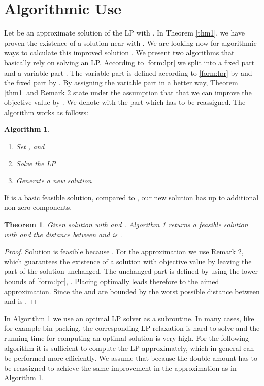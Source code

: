 \documentclass[a4paper,11pt]{article}
\newtheorem{thm}{Theorem}
\newtheorem{algo}{Algorithm}
\begin{document}
\section{Algorithmic Use}
Let  be an approximate solution of the LP with . 
In Theorem \ref{thm1}, we have proven the existence of a solution  near  with 
.
We are looking now for algorithmic ways to calculate this improved solution .
We present two algorithms that basically rely on solving an LP.
According to \ref{form:lpr} 
we split  into a fixed part  and a variable part .
The variable part is defined according to \ref{form:lpr} by  and the fixed part by . By assigning the variable part in a better way, Theorem
\ref{thm1} and Remark 2 state under the assumption that  that 
we can improve the objective value by . 
We denote with  the part which has to be reassigned. The
algorithm works as follows:
\begin{algo} \label{alg1}
\ 
  \begin{enumerate}
\item Set , 
  and 
\item Solve the LP 
\item Generate a new solution 
  \end{enumerate}
\end{algo}
If  is a basic feasible solution, compared to , our new solution  has up to  additional
non-zero components.
\begin{thm}
	Given solution  with  and .
	Algorithm \ref{alg1} returns a feasible solution  with  and the 
	distance between  and  is .
\end{thm}
\begin{proof}
Solution  is feasible because .
For the approximation we use Remark 2, which guarantees the existence of a solution 
with objective value 
 by leaving the part  of the solution  unchanged.
The unchanged part  is defined by using the lower bounds of \ref{form:lpr}, 
. Placing
 optimally leads therefore to the aimed approximation. Since the  and  are bounded by
 the worst possible distance between  and  is .
\end{proof}
In Algorithm \ref{alg1} we use an optimal LP solver as a subroutine. In many cases, like for example bin packing,
the corresponding LP relaxation is hard to solve and
the running time
for computing an optimal solution is very high. For the following algorithm it is sufficient to compute the LP
approximately, which in general can be performed more efficiently. We assume that 
because the double amount has to be reassigned to achieve the same improvement in the approximation as in Algorithm \ref{alg1}.
\end{document}
